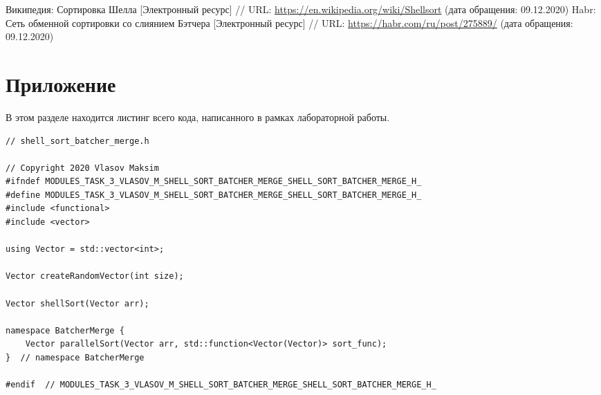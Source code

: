 \documentclass{report}
\begin{document}
\begin{thebibliography}{1}
 Википедия: Сортировка Шелла [Электронный ресурс] // URL: \url {https://en.wikipedia.org/wiki/Shellsort} (дата обращения: 09.12.2020)
 Habr: Сеть обменной сортировки со слиянием Бэтчера [Электронный ресурс] // URL: \url {https://habr.com/ru/post/275889/} (дата обращения: 09.12.2020)
\end{thebibliography}
\newpage

\section*{Приложение}
В этом разделе находится листинг всего кода, написанного в рамках лабораторной работы.
\begin{lstlisting}
// shell_sort_batcher_merge.h

// Copyright 2020 Vlasov Maksim
#ifndef MODULES_TASK_3_VLASOV_M_SHELL_SORT_BATCHER_MERGE_SHELL_SORT_BATCHER_MERGE_H_
#define MODULES_TASK_3_VLASOV_M_SHELL_SORT_BATCHER_MERGE_SHELL_SORT_BATCHER_MERGE_H_
#include <functional>
#include <vector>

using Vector = std::vector<int>;

Vector createRandomVector(int size);

Vector shellSort(Vector arr);

namespace BatcherMerge {
    Vector parallelSort(Vector arr, std::function<Vector(Vector)> sort_func);
}  // namespace BatcherMerge

#endif  // MODULES_TASK_3_VLASOV_M_SHELL_SORT_BATCHER_MERGE_SHELL_SORT_BATCHER_MERGE_H_
\end{lstlisting}
\end{document}
